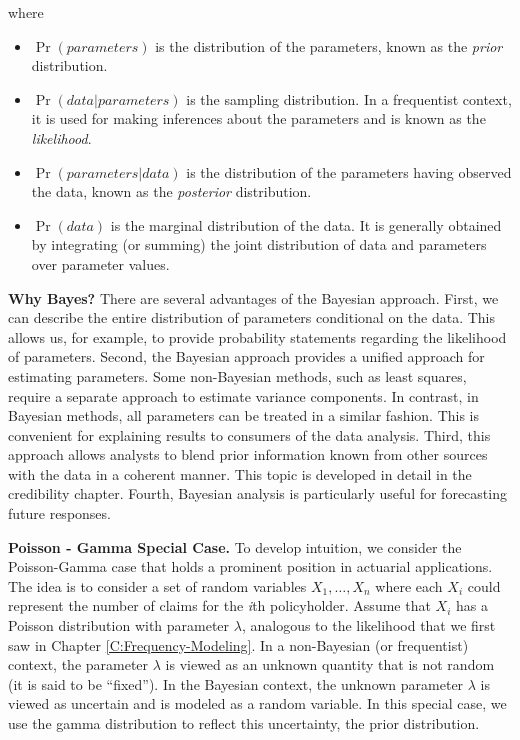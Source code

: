 \documentclass[]{book}
\providecommand{\tightlist}{%
  \setlength{\itemsep}{0pt}\setlength{\parskip}{0pt}}
\theoremstyle{definition}
\theoremstyle{definition}
\theoremstyle{definition}
\theoremstyle{remark}
\begin{document}
where

\begin{itemize}
\tightlist
\item
  \(\Pr(parameters)\) is the distribution of the parameters, known as
  the \emph{prior} distribution.
\item
  \(\Pr(data | parameters)\) is the sampling distribution. In a
  frequentist context, it is used for making inferences about the
  parameters and is known as the \emph{likelihood}.
\item
  \(\Pr(parameters | data)\) is the distribution of the parameters
  having observed the data, known as the \emph{posterior} distribution.
\item
  \(\Pr(data)\) is the marginal distribution of the data. It is
  generally obtained by integrating (or summing) the joint distribution
  of data and parameters over parameter values.
\end{itemize}

\textbf{Why Bayes?} There are several advantages of the Bayesian
approach. First, we can describe the entire distribution of parameters
conditional on the data. This allows us, for example, to provide
probability statements regarding the likelihood of parameters. Second,
the Bayesian approach provides a unified approach for estimating
parameters. Some non-Bayesian methods, such as least squares, require a
separate approach to estimate variance components. In contrast, in
Bayesian methods, all parameters can be treated in a similar fashion.
This is convenient for explaining results to consumers of the data
analysis. Third, this approach allows analysts to blend prior
information known from other sources with the data in a coherent manner.
This topic is developed in detail in the credibility chapter. Fourth,
Bayesian analysis is particularly useful for forecasting future
responses.

\textbf{Poisson - Gamma Special Case.} To develop intuition, we consider
the Poisson-Gamma case that holds a prominent position in actuarial
applications. The idea is to consider a set of random variables
\(X_1, \ldots, X_n\) where each \(X_i\) could represent the number of
claims for the \emph{i}th policyholder. Assume that \(X_i\) has a
Poisson distribution with parameter \(\lambda\), analogous to the
likelihood that we first saw in Chapter \ref{C:Frequency-Modeling}. In a
non-Bayesian (or frequentist) context, the parameter \(\lambda\) is
viewed as an unknown quantity that is not random (it is said to be
``fixed''). In the Bayesian context, the unknown parameter \(\lambda\)
is viewed as uncertain and is modeled as a random variable. In this
special case, we use the gamma distribution to reflect this uncertainty,
the prior distribution.
\end{document}
